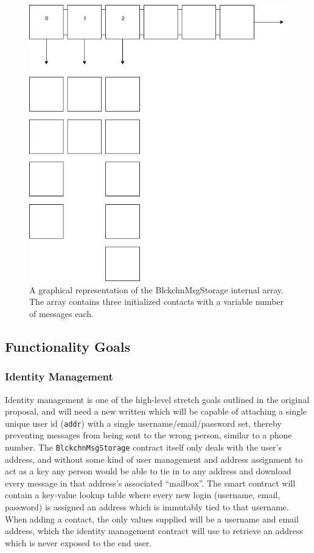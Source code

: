 \documentclass[titlepage]{report}
\begin{document}
\begin{figure}[tph!]
    \centering
    \includegraphics[width=0.7\linewidth]{message_storage}
    \caption{A graphical representation of the BlckchnMsgStorage internal array. The array contains three initialized contacts with a variable number of messages each.}
    \label{fig:messagestorage}
\end{figure}

\subsection{Functionality Goals}
\subsubsection{Identity Management}
\gls{Identity management} is one of the high-level stretch goals outlined in the original proposal, and will need a new  written which will be capable of attaching a single unique user id (\texttt{addr}) with a single username/email/password set, thereby preventing messages from being sent to the wrong person, similar to a phone number. The \texttt{BlckchnMsgStorage} contract itself only deals with the user's address, and without some kind of user management and address assignment to act as a key any person would be able to tie in to any address and download every message in that address's associated ``mailbox''. The smart contract will contain a key-value lookup table where every new login (username, email, password) is assigned an address which is immutably tied to that username. When adding a contact, the only values supplied will be a username and email address, which the identity management contract will use to retrieve an address which is never exposed to the end user.
\end{document}
